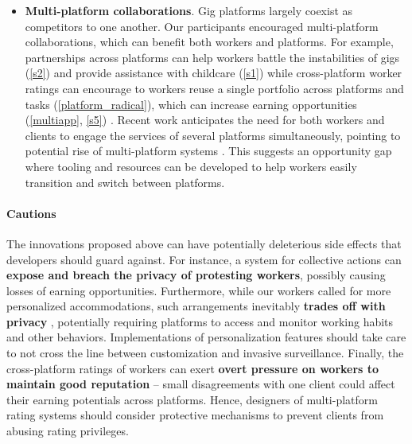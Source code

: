 \begin{itemize}
  \item \textbf{Multi-platform collaborations}. Gig platforms largely coexist as competitors to one another. Our participants encouraged multi-platform collaborations, which can benefit both workers and platforms. For example, partnerships across platforms can help workers battle the instabilities of gigs (\ref{s2}) and provide assistance with childcare (\ref{s1}) while cross-platform worker ratings can encourage to workers reuse a single portfolio across platforms and tasks (\ref{platform_radical}), which can increase earning opportunities (\ref{multiapp}, \ref{s5}) \cite{personal}. 
  Recent work anticipates the need for both workers and clients to engage the services of several platforms simultaneously, pointing to potential rise of multi-platform systems \cite{amiri2021separ}. This suggests an opportunity gap where tooling and resources can be developed to help workers easily transition and switch between platforms.
\end{itemize}

\paragraph{Cautions}
The innovations proposed above can have potentially deleterious side effects that developers should guard against. For instance, a system for collective actions can \textbf{expose and breach the privacy of protesting workers}, possibly causing losses of earning opportunities. Furthermore, while our workers called for more personalized accommodations, such arrangements inevitably \textbf{trades off with privacy }\cite{privacy, garcia2016personalization, lee2013designing}, potentially requiring platforms to access and monitor working habits and other behaviors. Implementations of personalization features should take care to not cross the line between customization and invasive surveillance. Finally, the cross-platform ratings of workers can exert \textbf{overt pressure on workers to maintain good reputation} -- small disagreements with one client could affect their earning potentials across platforms. Hence, designers of multi-platform rating systems should consider protective mechanisms to prevent clients from abusing rating privileges. 

